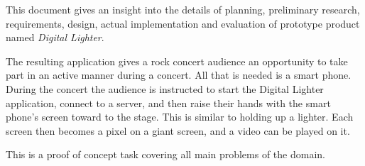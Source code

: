 This document gives an insight into the details of planning, preliminary research, requirements, design, actual implementation and evaluation of prototype product named \emph{Digital Lighter}.

The resulting application gives a rock concert audience an opportunity to take part in an active manner during a concert. 
All that is needed is a smart phone.
During the concert the audience is instructed to start the Digital Lighter application, connect to a server, and then raise their hands with the smart phone's screen toward to the stage. This is similar to holding up a lighter. 
Each screen then becomes a pixel on a giant screen, and a video can be played on it.

This is a proof of concept task covering all main problems of the domain.



